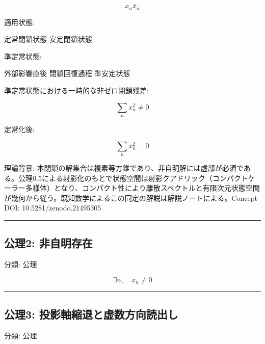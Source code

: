 \documentclass[
  a4paper,
]{ltjsarticle}
\newenvironment{Shaded}{}{}
\newcommand{\NormalTok}[1]{#1}
\begin{document}
\[
x_n\bar{x}_n
\]

適用状態:

\begin{Shaded}
\begin{Highlighting}[]
\NormalTok{定常閉鎖状態}
\NormalTok{安定閉鎖状態}
\end{Highlighting}
\end{Shaded}

準定常状態:

\begin{Shaded}
\begin{Highlighting}[]
\NormalTok{外部影響直後}
\NormalTok{閉鎖回復過程}
\NormalTok{準安定状態}
\end{Highlighting}
\end{Shaded}

準定常状態における一時的な非ゼロ閉鎖残差:

\[
\sum_n x_n^2\ne0
\]

定常化後:

\[
\sum_n x_n^2=0
\]

理論背景:
本閉鎖の解集合は複素等方錐であり、非自明解には虚部が必須である。公理0.5による射影化のもとで状態空間は射影クアドリック（コンパクトケーラー多様体）となり、コンパクト性により離散スペクトルと有限次元状態空間が幾何から従う。既知数学によるこの同定の解説は解説ノートによる。Concept
DOI: 10.5281/zenodo.21495305

\begin{center}\rule{0.5\linewidth}{0.5pt}\end{center}

\subsection{公理2:
非自明存在}\label{ux516cux74062-ux975eux81eaux660eux5b58ux5728}

分類: 公理

\[
\exists n,\quad x_n\neq0
\]

\begin{center}\rule{0.5\linewidth}{0.5pt}\end{center}

\subsection{公理3:
投影軸縮退と虚数方向読出し}\label{ux516cux74063-ux6295ux5f71ux8ef8ux7e2eux9000ux3068ux865aux6570ux65b9ux5411ux8aadux51faux3057}

分類: 公理
\end{document}
